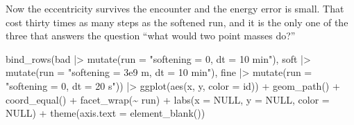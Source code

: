 \documentclass[
  10.5pt,
  letterpaper,
]{scrbook}
\newenvironment{Shaded}{\begin{snugshade}}{\end{snugshade}}
\newcommand{\AttributeTok}[1]{\textcolor[rgb]{0.00,0.00,0.00}{#1}}
\newcommand{\CommentTok}[1]{\textcolor[rgb]{0.00,0.00,0.00}{\textit{#1}}}
\newcommand{\ConstantTok}[1]{\textcolor[rgb]{0.00,0.00,0.00}{#1}}
\newcommand{\DecValTok}[1]{\textcolor[rgb]{0.00,0.00,0.00}{#1}}
\newcommand{\FunctionTok}[1]{\textcolor[rgb]{0.00,0.00,0.00}{#1}}
\newcommand{\NormalTok}[1]{\textcolor[rgb]{0.00,0.00,0.00}{#1}}
\newcommand{\OtherTok}[1]{\textcolor[rgb]{0.00,0.00,0.00}{#1}}
\newcommand{\SpecialCharTok}[1]{\textcolor[rgb]{0.00,0.00,0.00}{#1}}
\newcommand{\StringTok}[1]{\textcolor[rgb]{0.00,0.00,0.00}{#1}}
\theoremstyle{plain}
\theoremstyle{remark}
\begin{document}
\begin{Shaded}
\end{Shaded}

Now the eccentricity survives the encounter and the energy error is
small. That cost thirty times as many steps as the softened run, and it
is the only one of the three that answers the question ``what would two
point masses do?''

\begin{Shaded}
\begin{Highlighting}[]
\FunctionTok{bind\_rows}\NormalTok{(bad  }\SpecialCharTok{|\textgreater{}} \FunctionTok{mutate}\NormalTok{(}\AttributeTok{run =} \StringTok{"softening = 0, dt = 10 min"}\NormalTok{),}
\NormalTok{          soft }\SpecialCharTok{|\textgreater{}} \FunctionTok{mutate}\NormalTok{(}\AttributeTok{run =} \StringTok{"softening = 3e9 m, dt = 10 min"}\NormalTok{),}
\NormalTok{          fine }\SpecialCharTok{|\textgreater{}} \FunctionTok{mutate}\NormalTok{(}\AttributeTok{run =} \StringTok{"softening = 0, dt = 20 s"}\NormalTok{)) }\SpecialCharTok{|\textgreater{}}
  \FunctionTok{ggplot}\NormalTok{(}\FunctionTok{aes}\NormalTok{(x, y, }\AttributeTok{color =}\NormalTok{ id)) }\SpecialCharTok{+}
  \FunctionTok{geom\_path}\NormalTok{() }\SpecialCharTok{+}
  \FunctionTok{coord\_equal}\NormalTok{() }\SpecialCharTok{+}
  \FunctionTok{facet\_wrap}\NormalTok{(}\SpecialCharTok{\textasciitilde{}}\NormalTok{ run) }\SpecialCharTok{+}
  \FunctionTok{labs}\NormalTok{(}\AttributeTok{x =} \ConstantTok{NULL}\NormalTok{, }\AttributeTok{y =} \ConstantTok{NULL}\NormalTok{, }\AttributeTok{color =} \ConstantTok{NULL}\NormalTok{) }\SpecialCharTok{+}
  \FunctionTok{theme}\NormalTok{(}\AttributeTok{axis.text =} \FunctionTok{element\_blank}\NormalTok{())}
\end{Highlighting}
\end{Shaded}
\end{document}
